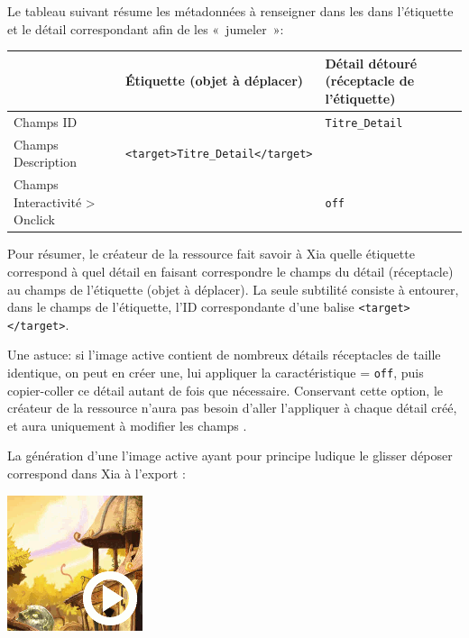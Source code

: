 {Le tableau suivant résume les métadonnées à renseigner dans les 
dans l'étiquette et le détail correspondant afin de les «~jumeler~»:

\begin{center}
\begin{tabular}{|p{}|p{2.5in}|p{1.5in}|}
\hline
 & Étiquette (objet à déplacer) & Détail détouré (réceptacle de l'étiquette)\\
\hline
Champs ID & & \verb|Titre_Detail|\\
\hline
Champs Description & \verb|<target>Titre_Detail</target>| & \\
\hline
Champs Interactivité > Onclick & & \verb|off|\\
\hline
\end{tabular}
\end{center}

Pour résumer, le créateur de la ressource fait savoir à Xia quelle étiquette correspond à quel détail en faisant 
correspondre le champs  du détail (réceptacle) au champs  de l'étiquette 
(objet à déplacer). La seule subtilité consiste à entourer, dans le champs 
de l'étiquette, l'ID correspondante d'une balise \verb|<target></target>|.

Une astuce: si l'image active contient de nombreux détails réceptacles de taille identique, 
on peut en créer une, lui appliquer la caractéristique  = \verb|off|, 
puis copier-coller ce détail autant de fois que nécessaire. Conservant cette option, 
le créateur de la ressource n'aura pas besoin d'aller l'appliquer à chaque détail créé, 
et aura uniquement à modifier les champs .

La génération d'une l'image active ayant pour principe ludique le glisser déposer 
correspond dans Xia à l'export :

\begin{center}
\includegraphics[scale=0.7]{./images/gameDragAndDrop} 
\end{center}

}
